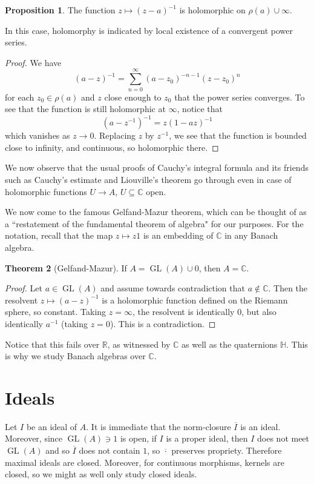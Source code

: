\documentclass[12pt]{report}
\newcommand{\RR}{\mathbb{R}}
\newcommand{\CC}{\mathbb{C}}
\newcommand{\GL}{\operatorname{GL}}
\theoremstyle{definition}
\newtheorem{theorem}{Theorem}[chapter]
\newtheorem{proposition}[theorem]{Proposition}
\begin{document}
\begin{proposition}
    The function $z \mapsto (z - a)^{-1}$ is holomorphic on $\rho(a) \cup \infty$.
\end{proposition}
    In this case, holomorphy is indicated by local existence of a convergent power series.
\begin{proof}
    We have
    $$(a - z)^{-1} = \sum_{n=0}^\infty (a - z_0)^{-n-1}(z-z_0)^n$$
    for each $z_0 \in \rho(a)$ and $z$ close enough to $z_0$ that the power series converges. To see that the function is still holomorphic at $\infty$, notice that
    $$(a - z^{-1})^{-1} = z(1 - az)^{-1}$$
    which vanishes as $z \to 0$. Replacing $z$ by $z^{-1}$, we see that the function is bounded close to infinity, and continuous, so holomorphic there.
\end{proof}

We now observe that the usual proofs of Cauchy's integral formula and its friends such as Cauchy's estimate and Liouville's theorem go through even in case of holomorphic functions $U \to A$, $U \subseteq \CC$ open.

We now come to the famous Gelfand-Mazur theorem, which can be thought of as a ``restatement of the fundamental theorem of algebra" for our purposes. For the notation, recall that the map $z \mapsto z1$ is an embedding of $\CC$ in any Banach algebra.
\begin{theorem}[Gelfand-Mazur]
    If $A = \GL(A) \cup 0$, then $A = \CC$.
\end{theorem}
\begin{proof}
    Let $a \in \GL(A)$ and assume towards contradiction that $a \notin \CC$. Then the resolvent $z \mapsto (a - z)^{-1}$ is a holomorphic function defined on the Riemann sphere, so constant. Taking $z = \infty$, the resolvent is identically $0$, but also identically $a^{-1}$ (taking $z = 0$). This is a contradiction.
\end{proof}
Notice that this fails over $\RR$, as witnessed by $\CC$ as well as the quaternions $\mathbb H$. This is why we study Banach algebras over $\CC$.

\section{Ideals}
Let $I$ be an ideal of $A$. It is immediate that the norm-closure $\overline I$ is an ideal. Moreover, since $\GL(A) \ni 1$ is open, if $I$ is a proper ideal, then $I$ does not meet $\GL(A)$ and so $\overline I$ does not contain $1$, so $\overline \cdot$ preserves propriety. Therefore maximal ideals are closed. Moreover, for continuous morphisms, kernels are closed, so we might as well only study closed ideals.
\end{document}

